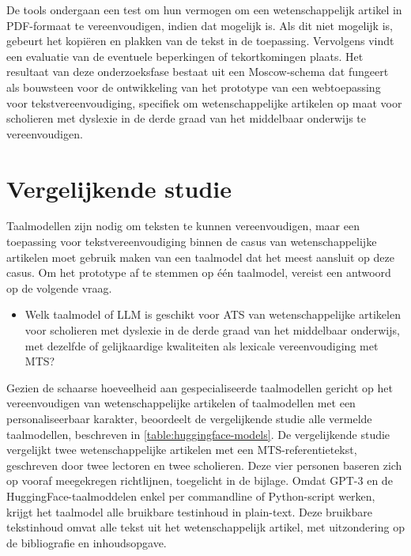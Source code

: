 De tools ondergaan een test om hun vermogen om een wetenschappelijk artikel in PDF-formaat te vereenvoudigen, indien dat mogelijk is. Als dit niet mogelijk is, gebeurt het kopiëren en plakken van de tekst in de toepassing. Vervolgens vindt een evaluatie van de eventuele beperkingen of tekortkomingen plaats. Het resultaat van deze onderzoeksfase bestaat uit een Moscow-schema dat fungeert als bouwsteen voor de ontwikkeling van het prototype van een webtoepassing voor tekstvereenvoudiging, specifiek om wetenschappelijke artikelen op maat voor scholieren met dyslexie in de derde graad van het middelbaar onderwijs te vereenvoudigen.

\section{Vergelijkende studie}
\label{sec:vergelijkende-studie}

Taalmodellen zijn nodig om teksten te kunnen vereenvoudigen, maar een toepassing voor tekstvereenvoudiging binnen de casus van wetenschappelijke artikelen moet gebruik maken van een taalmodel dat het meest aansluit op deze casus. Om het prototype af te stemmen op één taalmodel, vereist een antwoord op de volgende vraag. 

\begin{itemize}
	\item Welk taalmodel of LLM is geschikt voor ATS van wetenschappelijke artikelen voor scholieren met dyslexie in de derde graad van het middelbaar onderwijs, met dezelfde of gelijkaardige kwaliteiten als lexicale vereenvoudiging met MTS?
\end{itemize}


Gezien de schaarse hoeveelheid aan gespecialiseerde taalmodellen gericht op het vereenvoudigen van wetenschappelijke artikelen of taalmodellen met een personaliseerbaar karakter, beoordeelt de vergelijkende studie alle vermelde taalmodellen, beschreven in \ref{table:huggingface-models}. 
De vergelijkende studie vergelijkt twee wetenschappelijke artikelen met een MTS-referentietekst, geschreven door twee lectoren en twee scholieren. Deze vier personen baseren zich op vooraf meegekregen richtlijnen, toegelicht in de bijlage. Omdat GPT-3 en de HuggingFace-taalmoddelen enkel per commandline of Python-script werken, krijgt het taalmodel alle bruikbare testinhoud in plain-text. Deze bruikbare tekstinhoud omvat alle tekst uit het wetenschappelijk artikel, met uitzondering op de bibliografie en inhoudsopgave.

